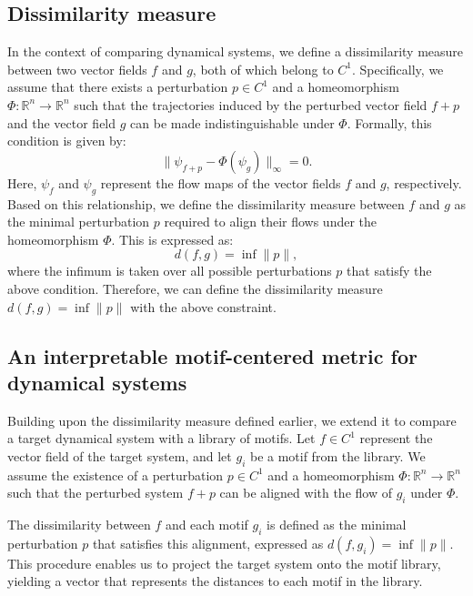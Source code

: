 \documentclass{article}
\theoremstyle{definition} \newtheorem{definition}{Definition}  \newtheorem{example}{Example}
\theoremstyle{remark} \newtheorem{remark}{Remark}
\newcounter{ct}
\begin{document}
\subsection{Dissimilarity measure}
In the context of comparing dynamical systems, we define a dissimilarity measure between two vector fields \( f \) and \( g \), both of which belong to \( C^1 \). Specifically, we assume that there exists a perturbation \( p \in C^1 \) and a homeomorphism \( \Phi: \mathbb{R}^n \rightarrow \mathbb{R}^n \) such that the trajectories induced by the perturbed vector field \( f + p \) and the vector field \( g \) can be made indistinguishable under \( \Phi \). Formally, this condition is given by:
\begin{equation}\label{eq:}
\|\psi_{f+p} - \Phi(\psi_{g})\|_\infty = 0.
\end{equation}
Here, \( \psi_{f} \) and \( \psi_{g} \) represent the flow maps of the vector fields \( f \) and \( g \), respectively. Based on this relationship, we define the dissimilarity measure between \( f \) and \( g \) as the minimal perturbation \( p \) required to align their flows under the homeomorphism \( \Phi \). This is expressed as:
\[
d(f, g) = \inf \|p\|,  %
\]
where the infimum is taken over all possible perturbations \( p \) that satisfy the above condition.
Therefore, we can define the dissimilarity measure $d(f,g) = \inf \|p\|$ with the above constraint.




\subsection{An interpretable motif-centered metric for dynamical systems}\label{sec:aut_motif_metric}
Building upon the dissimilarity measure defined earlier, we extend it to compare a target dynamical system with a library of motifs. Let \( f \in C^1 \) represent the vector field of the target system, and let \( g_i \) be a motif from the library. We assume the existence of a perturbation \( p \in C^1 \) and a homeomorphism \( \Phi: \mathbb{R}^n \rightarrow \mathbb{R}^n \) such that the perturbed system \( f + p \) can be aligned with the flow of \( g_i \) under \( \Phi \). 

The dissimilarity between \( f \) and each motif \( g_i \) is defined as the minimal perturbation \( p \) that satisfies this alignment, expressed as \( d(f, g_i) = \inf \|p\| \).
 This procedure enables us to project the target system onto the motif library, yielding a vector that represents the distances to each motif in the library.
\end{document}
